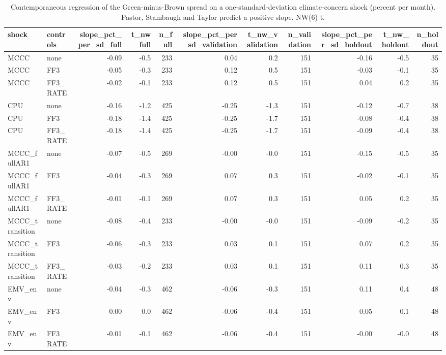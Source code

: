 \begin{table}
\caption{Contemporaneous regression of the Green-minus-Brown spread on a one-standard-deviation climate-concern shock (percent per month). Pastor, Stambaugh and Taylor predict a positive slope. NW(6) t.}
\label{tab:m1_contemp}
\begin{tabular}{llrrrrrrrrr}
\toprule
shock & controls & slope\_pct\_per\_sd\_full & t\_nw\_full & n\_full & slope\_pct\_per\_sd\_validation & t\_nw\_validation & n\_validation & slope\_pct\_per\_sd\_holdout & t\_nw\_holdout & n\_holdout \\
\midrule
MCCC & none & -0.09 & -0.5 & 233 & 0.04 & 0.2 & 151 & -0.16 & -0.5 & 35 \\
MCCC & FF3 & -0.05 & -0.3 & 233 & 0.12 & 0.5 & 151 & -0.03 & -0.1 & 35 \\
MCCC & FF3\_RATE & -0.02 & -0.1 & 233 & 0.12 & 0.5 & 151 & 0.04 & 0.2 & 35 \\
CPU & none & -0.16 & -1.2 & 425 & -0.25 & -1.3 & 151 & -0.12 & -0.7 & 38 \\
CPU & FF3 & -0.18 & -1.4 & 425 & -0.25 & -1.7 & 151 & -0.08 & -0.4 & 38 \\
CPU & FF3\_RATE & -0.18 & -1.4 & 425 & -0.25 & -1.7 & 151 & -0.09 & -0.4 & 38 \\
MCCC\_fullAR1 & none & -0.07 & -0.5 & 269 & -0.00 & -0.0 & 151 & -0.15 & -0.5 & 35 \\
MCCC\_fullAR1 & FF3 & -0.04 & -0.3 & 269 & 0.07 & 0.3 & 151 & -0.02 & -0.1 & 35 \\
MCCC\_fullAR1 & FF3\_RATE & -0.01 & -0.1 & 269 & 0.07 & 0.3 & 151 & 0.05 & 0.2 & 35 \\
MCCC\_transition & none & -0.08 & -0.4 & 233 & -0.00 & -0.0 & 151 & -0.09 & -0.2 & 35 \\
MCCC\_transition & FF3 & -0.06 & -0.3 & 233 & 0.03 & 0.1 & 151 & 0.07 & 0.2 & 35 \\
MCCC\_transition & FF3\_RATE & -0.03 & -0.2 & 233 & 0.03 & 0.1 & 151 & 0.11 & 0.3 & 35 \\
EMV\_env & none & -0.04 & -0.3 & 462 & -0.06 & -0.3 & 151 & 0.11 & 0.4 & 48 \\
EMV\_env & FF3 & 0.00 & 0.0 & 462 & -0.06 & -0.4 & 151 & 0.05 & 0.1 & 48 \\
EMV\_env & FF3\_RATE & -0.01 & -0.1 & 462 & -0.06 & -0.4 & 151 & -0.00 & -0.0 & 48 \\
\bottomrule
\end{tabular}
\end{table}
